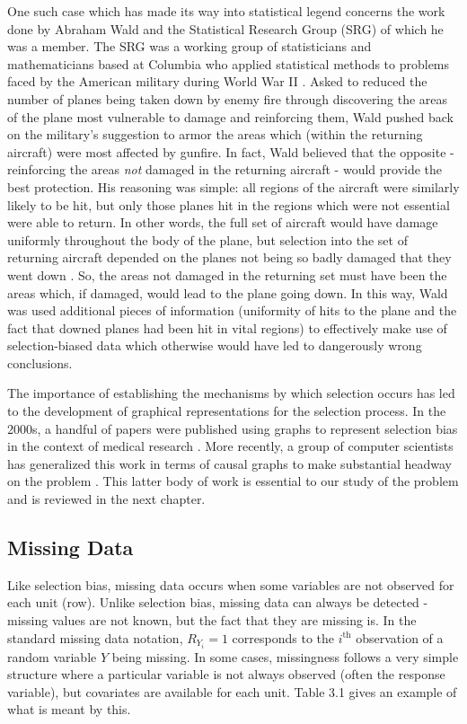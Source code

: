 \documentclass[12pt,twoside]{reedthesis}
\theoremstyle{definition}
\begin{document}
One such case which has made its way into statistical legend concerns the work done by Abraham Wald and the Statistical Research Group (SRG) of which he was a member. The SRG was a working group of statisticians and mathematicians based at Columbia who applied statistical methods to problems faced by the American military during World War II \citep{Wallis_1980a}. Asked to reduced the number of planes being taken down by enemy fire through discovering the areas of the plane most vulnerable to damage and reinforcing them, Wald pushed back on the military's suggestion to armor the areas which (within the returning aircraft) were most affected by gunfire. In fact, Wald believed that the opposite - reinforcing the areas \emph{not} damaged in the returning aircraft - would provide the best protection. His reasoning was simple: all regions of the aircraft were similarly likely to be hit, but only those planes hit in the regions which were not essential were able to return. In other words, the full set of aircraft would have damage uniformly throughout the body of the plane, but selection into the set of returning aircraft depended on the planes not being so badly damaged that they went down \citep{Wallis_1980b}. So, the areas not damaged in the returning set must have been the areas which, if damaged, would lead to the plane going down. In this way, Wald was used additional pieces of information (uniformity of hits to the plane and the fact that downed planes had been hit in vital regions) to effectively make use of selection-biased data which otherwise would have led to dangerously wrong conclusions. 

The importance of establishing the mechanisms by which selection occurs has led to the development of graphical representations for the selection process. In the 2000s, a handful of papers were published using graphs to represent selection bias in the context of medical research \citep{Geneletti_2008} \citep{Hernan_2004} \citep{Haneuse_2009}. More recently, a group of computer scientists has generalized this work in terms of causal graphs to make substantial headway on the problem \citep{Pearl_2011} \citep{Bareinboim_2012} \citep{Bareinboim_2014}. This latter body of work is essential to our study of the problem and is reviewed in the next chapter.

\subsection{Missing Data}

Like selection bias, missing data occurs when some variables are not observed for each unit (row). Unlike selection bias, missing data can always be detected - missing values are not known, but the fact that they are missing is. In the standard missing data notation, $R_{Y_i}=1$ corresponds to the $i^{\text{th}}$ observation of a random variable $Y$ being missing. In some cases, missingness follows a very simple structure where a particular variable is not always observed (often the response variable), but covariates are available for each unit. Table 3.1 gives an example of what is meant by this. 
\end{document}
